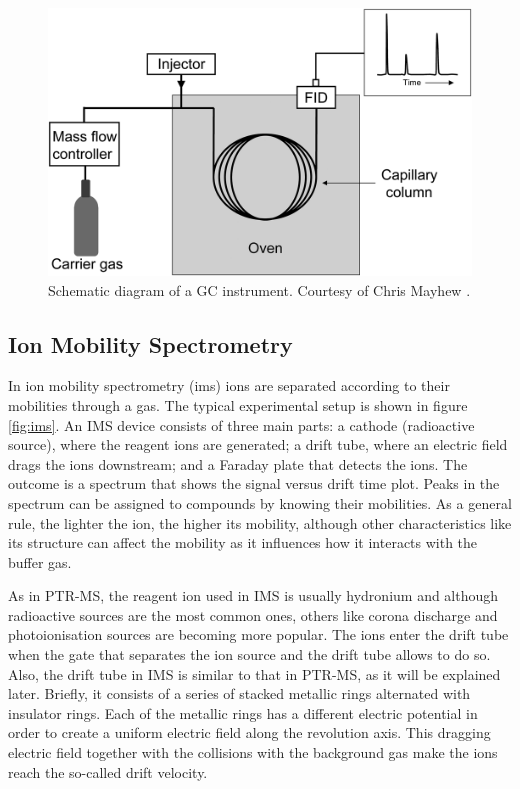 \begin{figure}%
\centering
    \includegraphics[width=0.6\linewidth]{pics/gc.png}
    \caption{Schematic diagram of a GC instrument. Courtesy of Chris Mayhew \cite{ellis2013proton}.}
    \label{fig:gc}
\end{figure}

\subsection{Ion Mobility Spectrometry}
In ion mobility spectrometry (\acrshort{ims}) ions are separated according to their mobilities through a gas. The typical experimental setup is shown in figure \ref{fig:ims}. An IMS device consists of three main parts: a cathode (radioactive source), where the reagent ions are generated; a drift tube, where an electric field drags the ions downstream; and a Faraday plate that detects the ions. The outcome is a spectrum that shows the signal versus drift time plot. Peaks in the spectrum can be assigned to compounds by knowing their mobilities. As a general rule, the lighter the ion, the higher its mobility, although other characteristics like its structure can affect the mobility as it influences how it interacts with the buffer gas. 

As in PTR-MS, the reagent ion used in IMS is usually hydronium and although radioactive sources are the most common ones, others like corona discharge and photoionisation sources are becoming more popular. The ions enter the drift tube when the gate that separates the ion source and the drift tube allows to do so. Also, the drift tube in IMS is similar to that in PTR-MS, as it will be explained later. Briefly, it consists of a series of stacked metallic rings alternated with insulator rings. Each of the metallic rings has a different electric potential in order to create a uniform electric field along the revolution axis. This dragging electric field together with the collisions with the background gas make the ions reach the so-called drift velocity.

